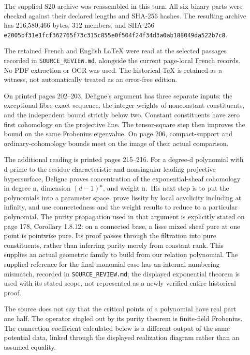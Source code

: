 \documentclass[
  11pt,
]{article}
\begin{document}
The supplied S20 archive was reassembled in this turn. All six binary
parts were checked against their declared lengths and SHA-256 hashes.
The resulting archive has 216,580,466 bytes, 312 members, and SHA-256
\texttt{e2005bf31e1fcf362765f73c315c855e0f504f24f34d3a0ab188049da522b7c8}.

The retained French and English LaTeX were read at the selected passages
recorded in \texttt{SOURCE\_REVIEW.md}, alongside the current page-local
French records. No PDF extraction or OCR was used. The historical TeX is
retained as a witness, not automatically treated as an error-free
edition.

On printed pages 202--203, Deligne's argument has three separate inputs:
the exceptional-fibre exact sequence, the integer weights of nonconstant
constituents, and the independent bound strictly below two. Constant
constituents have zero first cohomology on the projective line. The
tensor-square step then improves the bound on the same Frobenius
eigenvalue. On page 206, compact-support and ordinary-cohomology bounds
meet on the image of their actual comparison.

The additional reading is printed pages 215--216. For a degree-d
polynomial with d prime to the residue characteristic and nonsingular
leading projective hypersurface, Deligne proves concentration of the
exponential-sheaf cohomology in degree n, dimension \((d-1)^n\), and
weight n.~His next step is to put the polynomials into a parameter
space, prove lissity by local acyclicity including at infinity, and use
connectedness and the weight results to reduce to a particular
polynomial. The purity propagation used in that argument is explicitly
stated on page 178, Corollary 1.8.12: on a connected base, a lisse mixed
sheaf pure at one point is pointwise pure. Its proof passes through the
filtration into pure constituents, rather than inferring purity merely
from constant rank. This supplies an actual geometric family to build
from our relation polynomial. The supplied reference for the final
monomial case has an internal numbering mismatch, recorded in
\texttt{SOURCE\_REVIEW.md}; the displayed exponential theorem is used
with its stated scope, not represented as a newly verified entire
historical proof.

The source does not say that the critical points of a polynomial have
real part one half. The operator singled out by its purity theorem is
finite-field Frobenius. The connection coefficient calculated below is a
different output of the same potential data, linked through the
displayed realization diagram rather than an assumed equality.
\end{document}
